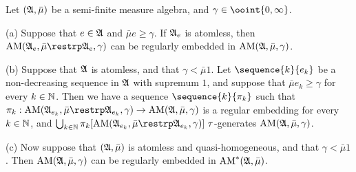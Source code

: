  Let $(\frak A,\bar\mu)$ be a semi-finite
measure algebra, and $\gamma\in\ooint{0,\infty}$.

(a) Suppose that $e\in\frak A$ and $\bar\mu e\ge\gamma$.
If $\frak A_e$ is atomless, then
$\AM(\frak A_e,\bar\mu\restrp\frak A_e,\gamma)$ can be regularly
embedded in $\mathop{\text{AM}}(\frak A,\bar\mu,\gamma)$.

(b)
Suppose that $\frak A$ is atomless, and that $\gamma<\bar\mu 1$.
Let $\sequence{k}{e_k}$ be a non-decreasing sequence in $\frak A$
with supremum $1$, and
suppose that $\bar\mu e_k\ge\gamma$ for every $k\in\Bbb N$.   Then
we have a sequence $\sequence{k}{\pi_k}$ such that
$\pi_k:\AM(\frak A_{e_k},\bar\mu\restrp\frak A_{e_k},\gamma)\to
\AM(\frak A,\bar\mu,\gamma)$ is a regular embedding for every
$k\in\Bbb N$, and
$\bigcup_{k\in\Bbb N}
\pi_k[\AM(\frak A_{e_k},\bar\mu\restrp\frak A_{e_k},\gamma)]
\,\,\tau$-generates $\mathop{\text{AM}}(\frak A,\bar\mu,\gamma)$.

(c) Now suppose that $(\frak A,\bar\mu)$ is atomless
and quasi-homogeneous, and that $\gamma<\bar\mu 1$.   Then
$\mathop{\text{AM}}(\frak A,\bar\mu,\gamma)$ can be regularly
embedded in $\mathop{\text{AM}}^*(\frak A,\bar\mu)$.

